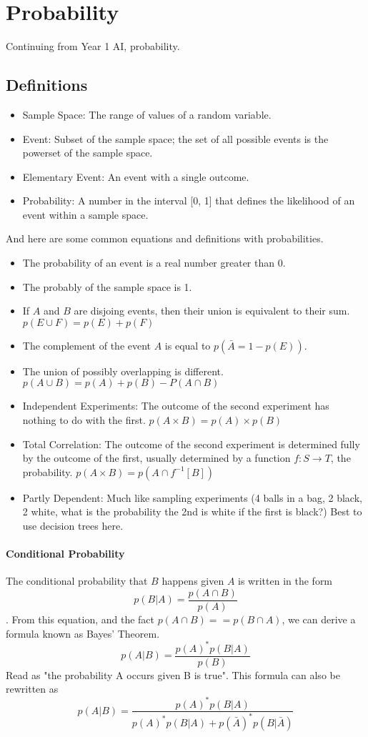 \section{Probability}
Continuing from Year 1 AI, probability.
\subsection{Definitions}
\begin{itemize}
	\item Sample Space: The range of values of a random variable.
	\item Event: Subset of the sample space; the set of all possible events is the powerset of the sample space. 
	\item Elementary Event: An event with a single outcome.
	\item Probability: A number in the interval [0, 1] that defines the likelihood of an event within a sample space.
\end{itemize}
And here are some common equations and definitions with probabilities.
\begin{itemize}
	\item The probability of an event is a real number greater than 0.
	\item The probably of the sample space is 1.
	\item If $A$ and $B$ are disjoing events, then their union is equivalent to their sum. $p(E \cup F) = p(E) + p(F)$
	\item The complement of the event $A$ is equal to $p(\bar{A} = 1 - p(E))$.
	\item The union of possibly overlapping is different. $p(A \cup B) = p(A) + p(B) - P(A \cap B)$
	\item Independent Experiments: The outcome of the second experiment has nothing to do with the first. $p(A\times B) = p(A) \times p(B)$
	\item Total Correlation: The outcome of the second experiment is determined fully by the outcome of the first, usually determined by a function $f: S \rightarrow T$, the probability. $p(A\times B) = p(A \cap f^{-1}[B])$
	\item Partly Dependent: Much like sampling experiments (4 balls in a bag, 2 black, 2 white, what is the probability the 2nd is white if the first is black?) Best to use decision trees here.
\end{itemize}
\paragraph{Conditional Probability} The conditional probability that $B$ happens given $A$ is written in the form \[p(B|A) = \frac{p(A \cap B)}{p(A)}\]. From this equation, and the fact $p(A \cap B) == p(B \cap A)$, we can derive a formula known as Bayes' Theorem. \[ p(A|B) =\frac{p(A)^*p(B|A)}{p(B)} \] Read as "the probability A occurs given B is true". This formula can also be rewritten as \[ p(A|B) =\frac{p(A)^*p(B|A)}{p(A)^*p(B|A) + p(\bar{A})^*p(B|\bar{A})}\]
